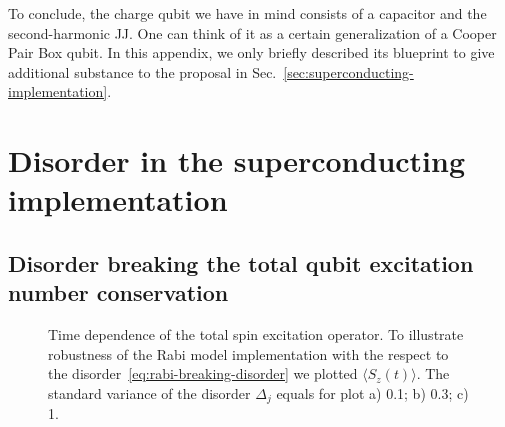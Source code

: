 \documentclass[reprint, aps, prx, amsmath, amssymb, longbibliography, superscriptaddress]{revtex4-2}
\begin{document}
To conclude, the charge qubit we have in mind consists of a capacitor and the second-harmonic JJ. One can think of it as a certain generalization of a Cooper Pair Box qubit. In this appendix, we only briefly described its blueprint to give additional substance to the proposal in Sec.~\ref{sec:superconducting-implementation}.


\section{Disorder in the superconducting implementation}
\label{app:disorder}
\subsection{Disorder breaking the total qubit excitation number conservation}


\begin{figure}[th]
    \captionsetup[subfloat]{captionskip=-135pt} %
    \centering
    \caption{Time dependence of the total spin excitation operator. To illustrate robustness of the Rabi model implementation with the respect to the disorder~\eqref{eq:rabi-breaking-disorder} we plotted $\langle S_z(t) \rangle$. The standard variance of the disorder $\Delta_j$ equals for plot a) 0.1; b) 0.3; c) 1.}
    \label{fig:spin-excitation-plot}
\end{figure}
\end{document}
